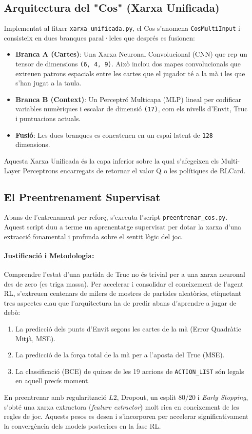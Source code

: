 \documentclass[a4paper,11pt]{article}
\begin{document}
\subsection{Arquitectura del "Cos" (Xarxa Unificada)}
Implementat al fitxer \texttt{xarxa\_unificada.py}, el Cos s'anomena \texttt{CosMultiInput} i consisteix en dues branques paral·leles que després es fusionen:
\begin{itemize}
    \item \textbf{Branca A (Cartes)}: Una Xarxa Neuronal Convolucional (CNN) que rep un tensor de dimensions \texttt{(6, 4, 9)}. Això inclou dos mapes convolucionals que extreuen patrons espacials entre les cartes que el jugador té a la mà i les que s'han jugat a la taula.
    \item \textbf{Branca B (Context)}: Un Perceptró Multicapa (MLP) lineal per codificar variables numèriques i escalar de dimensió \texttt{(17)}, com els nivells d'Envit, Truc i puntuacions actuals.
    \item \textbf{Fusió}: Les dues branques es concatenen en un espai latent de \texttt{128} dimensions.
\end{itemize}
Aquesta Xarxa Unificada és la capa inferior sobre la qual s'afegeixen els Multi-Layer Perceptrons encarregats de retornar el valor Q o les polítiques de RLCard.

\subsection{El Preentrenament Supervisat}
Abans de l'entrenament per reforç, s'executa l'script \texttt{preentrenar\_cos.py}. Aquest script duu a terme un aprenentatge supervisat per dotar la xarxa d'una extracció fonamental i profunda sobre el sentit lògic del joc.

\paragraph{Justificació i Metodologia:}
Comprendre l'estat d'una partida de Truc no és trivial per a una xarxa neuronal des de zero (es triga massa). Per accelerar i consolidar el coneixement de l'agent RL, s'extreuen centenars de milers de mostres de partides aleatòries, etiquetant tres aspectes clau que l'arquitectura ha de predir abans d'aprendre a jugar de debò:
\begin{enumerate}
    \item La predicció dels punts d'Envit segons les cartes de la mà (Error Quadràtic Mitjà, MSE).
    \item La predicció de la força total de la mà per a l'aposta del Truc (MSE).
    \item La classificació (BCE) de quines de les 19 accions de \texttt{ACTION\_LIST} són legals en aquell precís moment.
\end{enumerate}
En preentrenar amb regularització $L2$, Dropout, un esplit 80/20 i \textit{Early Stopping}, s'obté una xarxa extractora (\textit{feature extractor}) molt rica en coneixement de les regles de joc. Aquests pesos es desen i s'incorporen per accelerar significativament la convergència dels models posteriors en la fase RL.
\end{document}
